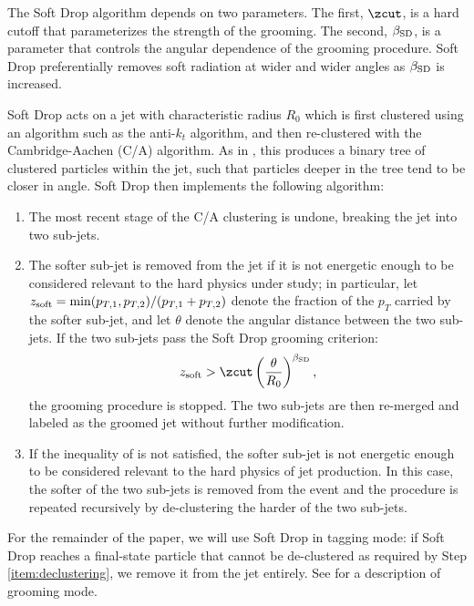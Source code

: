 The Soft Drop algorithm depends on two parameters.
%
The first, \(\zcut\), is a hard cutoff that parameterizes the strength of the grooming.
%
The second, \(\beta_{\rm SD}\), is a parameter that controls the angular dependence of the grooming procedure.
%
Soft Drop preferentially removes soft radiation at wider and wider angles as \(\beta_{\rm SD}\) is increased.

Soft Drop acts on a jet with characteristic radius \(R_0\) which is first clustered using an algorithm such as the anti-\(k_t\) algorithm, and then re-clustered with the Cambridge-Aachen (C/A) algorithm.
%
As in , this produces a binary tree of clustered particles within the jet, such that particles deeper in the tree tend to be closer in angle.
%
Soft Drop then implements the following algorithm:
\begin{enumerate}
    \item
    \label{item:declustering}
    The most recent stage of the C/A clustering is undone, breaking the jet into two sub-jets.

    \item
    The softer sub-jet is removed from the jet if it is not energetic enough to be considered relevant to the hard physics under study;
    in particular, let \(z_{\rm soft} = \min(p_{T,1}, p_{T,2})/(p_{T,1} + p_{T,2})\) denote the fraction of the \(p_T\) carried by the softer sub-jet, and let \(\theta\) denote the angular distance between the two sub-jets.
    If the two sub-jets pass the Soft Drop grooming criterion:
     \begin{align}
        z_{\rm soft} > \zcut \left(\frac{\theta}{R_0}\right)^{\beta_{\rm SD}}
        \label{eqn:softdropcriterion}
        ,
    \end{align}
    the grooming procedure is stopped.
    The two sub-jets are then re-merged and labeled as the groomed jet without further modification.

    \item
    If the inequality of  is not satisfied, the softer sub-jet is not energetic enough to be considered relevant to the hard physics of jet production.
    In this case, the softer of the two sub-jets is removed from the event and the procedure is repeated recursively by de-clustering the harder of the two sub-jets.
\end{enumerate}
%
For the remainder of the paper, we will use Soft Drop in tagging mode:
%
if Soft Drop reaches a final-state particle that cannot be de-clustered as required by Step \ref{item:declustering}, we remove it from the jet entirely.
%
See  for a description of grooming mode.


